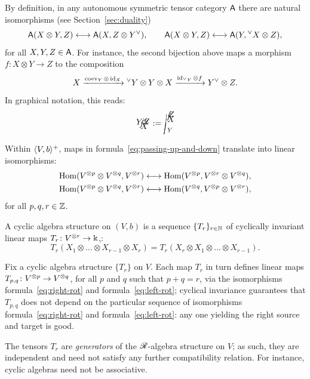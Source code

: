 By definition, in any autonomous symmetric tensor category $\mathsf{A}$ there
are natural isomorphisms (see Section~\ref{sec:duality})
\begin{equation}
  \label{eq:passing-up-and-down}
  \A(X\otimes Y, Z) \longleftrightarrow \A(X, Z\otimes\rdl{Y}),
  \qquad
  \A(X\otimes Y, Z) \longleftrightarrow \A(Y, \ldl{X}\otimes Z),
\end{equation}
for all $X, Y, Z \in \mathsf{A}$. For instance, the second bijection above maps
a morphism $f\colon X \otimes Y \to Z$ to the composition
\begin{equation*}
  X \xrightarrow{\coev_Y \otimes \id_X} \ldl{Y} \otimes Y \otimes X %
  \xrightarrow{\id_{\ldl{Y}} \otimes f} \rdl{Y} \otimes Z.%
\end{equation*}
In graphical notation, this reads:
\begin{equation*}
  {\xy*!LC\xybox{%
      (0,1)*+[F]{\rdl{f}};%
      (0,0)*{X}**\dir{-},%
      (-1,2)*{\rdl{Y}}**\dir{-},(1,2)*{Z}**\dir{-},%
      }\endxy
    \joinrel:=
    \xy*!LC\xybox{%
      (0,1)*+[F]{f}="x";%
      (1,0)*{X}**\dir{-},%
      \vloop~{(-1,0.5)}{"x"+DL+/d6mm/}{(-1,2)}{"x"+DL+/r1mm/}|{Y},%
      (1,2)*{Z}**\dir{-},%
      }\endxy}
\end{equation*}
Within $\langle V,b\rangle^+$, maps in formula~\ref{eq:passing-up-and-down} translate
into linear isomorphisms:
\begin{gather}
  \operatorname{Hom}(V\sp{\otimes p}\otimes V\sp{\otimes q}, V\sp{\otimes r}) \longleftrightarrow \operatorname{Hom}(V\sp{\otimes p},
  V\sp{\otimes r}\otimes V\sp{\otimes q}),
  \label{eq:right-rot}
  \\
  \operatorname{Hom}(V\sp{\otimes p}\otimes V\sp{\otimes q}, V\sp{\otimes r}) \longleftrightarrow \operatorname{Hom}(V\sp{\otimes q},
  V\sp{\otimes p}\otimes V\sp{\otimes r}), 
  \label{eq:left-rot}
\end{gather}
for all $p,q,r \in \mathbb{Z}$.

\begin{definition}
  \label{dfn:cyclic-algebra}
  A cyclic algebra structure on $(V, b)$ is a sequence
  $\{T_r\}_{r\in\mathbb{N}}$ of cyclically invariant linear maps $T_r \colon
  V\sp{\otimes r} \to \Bbbk$,:
  \begin{equation*}
    T_r (X_1 \otimes \dots \otimes X_{r-1} \otimes X_r) = 
    T_r (X_r \otimes X_1 \otimes \dots \otimes X_{r-1}).
  \end{equation*}
\end{definition}
Fix a cyclic algebra structure $\{T_r\}$ on $V$.  Each map $T_r$
in turn defines linear maps $T_{p,q}\colon V\sp{\otimes p} \to V\sp{\otimes q}$, for all
$p$ and $q$ such that $p+q=r$, via the isomorphisms
formula~\ref{eq:right-rot} and formula~\ref{eq:left-rot}; cyclical
invariance guarantees that $T_{p,q}$ does not depend on the
particular sequence of isomorphisms formula~\ref{eq:right-rot} and
formula~\ref{eq:left-rot}: any one yielding the right source and
target is good.
\begin{remark}
  The tensors $T_r$ are \emph{generators} of the $\mathscr{R}$-algebra
  structure on $V$; as such, they are independent and need not satisfy
  any further compatibility relation. For instance, cyclic algebras
  need not be associative.
\end{remark}

